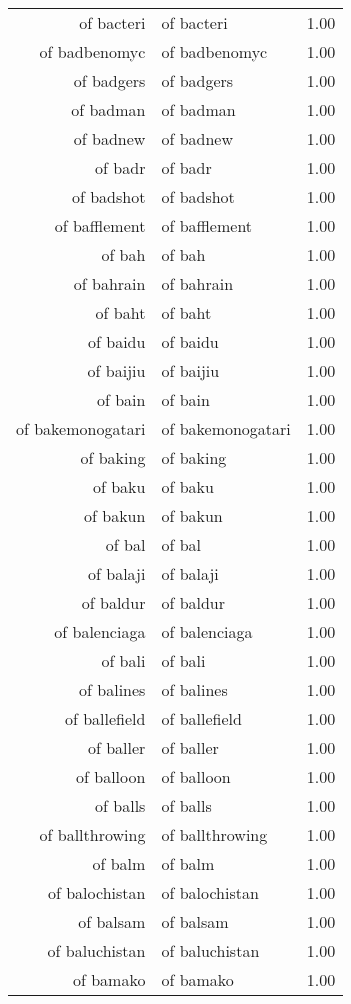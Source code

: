 \begin{table}[ht]
\begin{tabular}{rlr}
  of bacteri & of bacteri & 1.00 \\ 
  of badbenomyc & of badbenomyc & 1.00 \\ 
  of badgers & of badgers & 1.00 \\ 
  of badman & of badman & 1.00 \\ 
  of badnew & of badnew & 1.00 \\ 
  of badr & of badr & 1.00 \\ 
  of badshot & of badshot & 1.00 \\ 
  of bafflement & of bafflement & 1.00 \\ 
  of bah & of bah & 1.00 \\ 
  of bahrain & of bahrain & 1.00 \\ 
  of baht & of baht & 1.00 \\ 
  of baidu & of baidu & 1.00 \\ 
  of baijiu & of baijiu & 1.00 \\ 
  of bain & of bain & 1.00 \\ 
  of bakemonogatari & of bakemonogatari & 1.00 \\ 
  of baking & of baking & 1.00 \\ 
  of baku & of baku & 1.00 \\ 
  of bakun & of bakun & 1.00 \\ 
  of bal & of bal & 1.00 \\ 
  of balaji & of balaji & 1.00 \\ 
  of baldur & of baldur & 1.00 \\ 
  of balenciaga & of balenciaga & 1.00 \\ 
  of bali & of bali & 1.00 \\ 
  of balines & of balines & 1.00 \\ 
  of ballefield & of ballefield & 1.00 \\ 
  of baller & of baller & 1.00 \\ 
  of balloon & of balloon & 1.00 \\ 
  of balls & of balls & 1.00 \\ 
  of ballthrowing & of ballthrowing & 1.00 \\ 
  of balm & of balm & 1.00 \\ 
  of balochistan & of balochistan & 1.00 \\ 
  of balsam & of balsam & 1.00 \\ 
  of baluchistan & of baluchistan & 1.00 \\ 
  of bamako & of bamako & 1.00 \\ 

\end{tabular}
\end{table}
